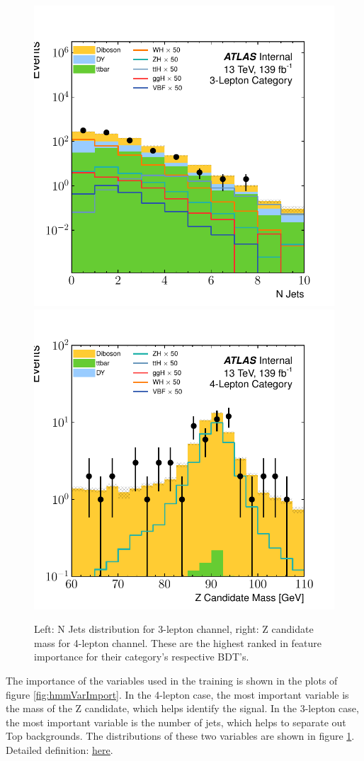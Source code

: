 
\begin{figure}[htpb]
  \centering
  \includegraphics[height=0.48\textwidth]{figures/hmm/nJets/histo-3lep-nJets.pdf}
  \includegraphics[height=0.48\textwidth]{figures/hmm/zCand/histo-4lep-auxDilep_mass.pdf}
  \caption{Left: N Jets distribution for 3-lepton channel, right: Z candidate mass for 4-lepton channel. These are the highest ranked in feature importance for their category's respective BDT's.}
    \label{fig:hmmImpVars}
\end{figure}

The importance of the variables used in the training is shown in the plots of figure \ref{fig:hmmVarImport}.
In the 4-lepton case, the most important variable is the mass of the Z candidate, which helps identify the signal.
In the 3-lepton case, the most important variable is the number of jets, which helps to separate out Top backgrounds.
The distributions of these two variables are shown in figure \ref{fig:hmmImpVars}.
Detailed definition: \href{https://scikit-learn.org/stable/modules/feature_selection.html}{\underline{here}}.

